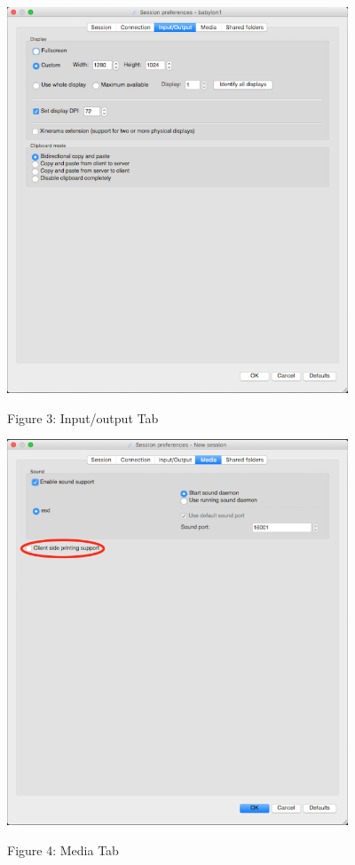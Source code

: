 \documentclass[
]{article}
\begin{document}
\includegraphics[width=4.00394in,height=4.5315in]{images/media/image3.png}

Figure 3: Input/output Tab

\includegraphics[width=4.00394in,height=4.5315in]{images/media/image4.png}

Figure 4: Media Tab
\end{document}
